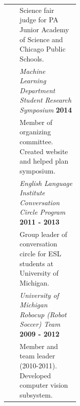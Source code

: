 \documentclass{article}
\begin{document}
\begin{longtable}{@{}>{\raggedleft}p{0.17\linewidth}
     p{}@{}}
  & Science fair judge for PA Junior Academy of Science and Chicago Public Schools.\\[0.5em]
  & \textit{Machine Learning Department Student Research Symposium}
    \hfill\textbf{2014}\\
  & Member of organizing committee. Created website and helped plan symposium.\\[0.5em]
  & \textit{English Language Institute Conversation Circle Program}
    \hfill\textbf{2011 - 2013}\\
  & Group leader of conversation circle for ESL students at University of Michigan.\\[0.5em]
  & \textit{University of Michigan Robocup (Robot Soccer) Team}
    \hfill\textbf{2009 - 2012}\\
  & Member and team leader (2010-2011). Developed computer vision subsystem.\\[1.5em]
\end{longtable}
\end{document}
